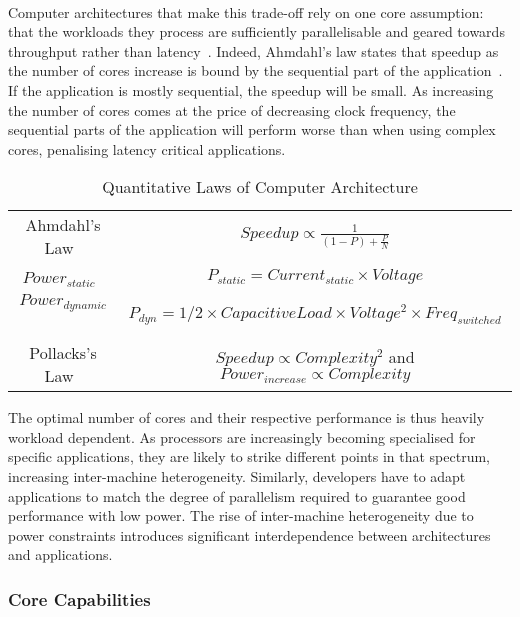 \paragraph{} Computer architectures that make this trade-off rely on one core assumption: that the workloads they process are sufficiently parallelisable and geared towards throughput rather than latency~\cite{FSSP:09}.
Indeed, Ahmdahl's law states that speedup as the number of cores increase
is bound by the sequential part of the application~\cite{4563876}. If the application  is mostly sequential, the speedup will be small. As increasing the number of  cores comes at the price of decreasing clock frequency, the sequential
parts of the application will perform worse than when using complex cores, penalising latency
critical applications. 

\begin{table*}
\begin{center}
\caption{Quantitative Laws of Computer Architecture}
\label{table:quantlaws}
\begin{tabular}{|c|c|}
Ahmdahl's Law~\cite{4563876} & $ Speedup \propto \frac{1}{(1 - P) + \frac{P}{N}} $\\ 
$Power_{static}$~\cite{hennessy2006comparchquantitative} & $P_{static} = Current_{static} \times Voltage$ \\
$Power_{dynamic}$~\cite{hennessy2006comparchquantitative} & $P_{dyn} = 1/2 \times Capacitive Load  \times Voltage^{2} \times Freq_{switched}$\\
Pollacks's Law~\cite{borkar2011future}& $ Speedup \propto Complexity^{2}$ and  $Power_{increase} \propto Complexity$\\
\end{tabular}
\end{center}

\end{table*}

The optimal number of cores and their respective 
performance is thus heavily workload dependent. As processors are increasingly becoming specialised for specific applications, they are likely to strike different points in that spectrum, 
increasing inter-machine heterogeneity. Similarly,
developers have to adapt applications to match 
the degree of parallelism required to guarantee good performance
with low power. The rise of inter-machine heterogeneity
due to power constraints introduces significant interdependence
between architectures and applications. 

\subsubsection{Core Capabilities}
